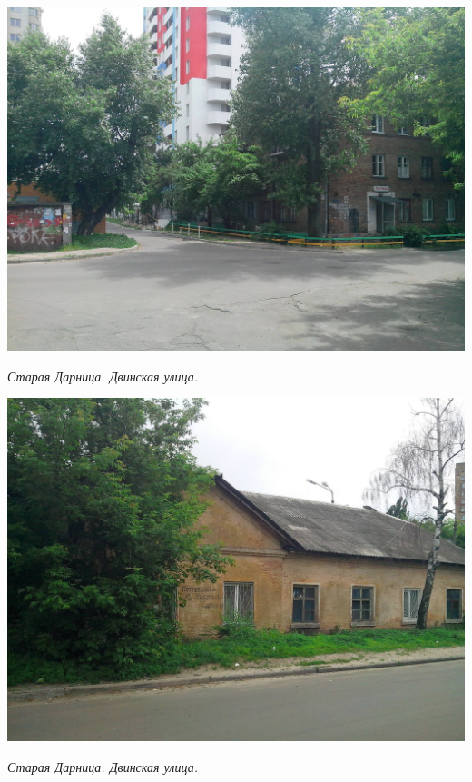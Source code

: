 \begin{center}
\includegraphics[width=\linewidth]{lpix/IMG_20160613_140125.jpg}

\textit{Старая Дарница. Двинская улица.}
\end{center}


\begin{center}
\includegraphics[width=\linewidth]{lpix/IMG_20160613_140440.jpg}

\textit{Старая Дарница. Двинская улица.}
\end{center}


